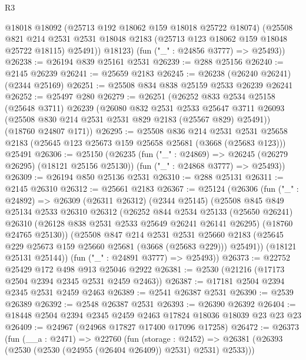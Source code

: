 \begin{lexlean}{R3}
\begin{coremodule}
          @18018
          @18092
          (@25713 @192 @18062 @159 @18018 @25722 @18074)
          (@25508
            @821
            @214
            @2531
            @2531
            @18048
            @2183
            (@25713 @123 @18062 @159 @18048 @25722 @18115)
            @25491))
        @18123)
      (fun ("_" : @24856 @3777) => @25493))
@26238 := @26194 @839 @25161 @2531
@26239 := @288 @25156
@26240 := @2145 @26239
@26241 := @25659 @2183
@26245 := @26238 (@26240 @26241) (@2344 @25169)
@26251 := @25508 @834 @838 @25159 @2533 @26239 @26241
@26252 := @25497 @280
@26279 := @26251
    (@26252
      @833
      @2534
      @25158
      (@25648 @3711)
      @26239
      (@26080
        @832
        @2531
        @2533
        @25647
        @3711
        @26093
        (@25508 @830 @214 @2531 @2531 @829 @2183 (@25567 @829) @25491))
      (@18760 @24807 @171))
@26295 := @25508
    @836
    @214
    @2531
    @2531
    @25658
    @2183
    (@25645 @123 @25673 @159 @25658 @25681 (@3668 (@25683 @123)))
    @25491
@26306 := @25150
    (@26235
      (fun ("_" : @24869) => @26245 (@26279 @26295) (@18121 @25156 @25130))
      (fun ("_" : @24868 @3777) => @25493))
@26309 := @26194 @850 @25136 @2531
@26310 := @288 @25131
@26311 := @2145 @26310
@26312 := @25661 @2183
@26367 := @25124
    (@26306
      (fun ("_" : @24892) =>
      @26309
        (@26311 @26312)
        (@2344 @25145)
        (@25508
          @845
          @849
          @25134
          @2533
          @26310
          @26312
          (@26252
            @844
            @2534
            @25133
            (@25650 @26241)
            @26310
            (@26128 @838 @2531 @2533 @25649 @26241 @26141 @26295)
            (@18760 @24765 @25130))
          (@25508
            @847
            @214
            @2531
            @2531
            @25660
            @2183
            (@25645 @229 @25673 @159 @25660 @25681 (@3668 (@25683 @229)))
            @25491))
        (@18121 @25131 @25144))
      (fun ("_" : @24891 @3777) => @25493))
@26373 := @22752 @25429 @172 @498 @913 @25046 @2922
@26381 := @2530 (@21216 (@17173 @2504 @2394 @2345 @2531 @2459 @2463))
@26387 := @17181 @2504 @2394 @2345 @2531 @2459 @2463
@26389 := @2541 @26387 @2531
@26390 := @2539 @26389
@26392 := @2548 @26387 @2531
@26393 := @26390 @26392
@26404 := @18448 @2504 @2394 @2345 @2459 @2463 @17824 @18036 @18039 @23 @23 @23
@26409 := @24967 (@24968 @17827 @17400 @17096 @17258)
@26472 := @26373
    (fun (__a : @2471) =>
    @22760
      (fun (storage : @2452) =>
      @26381 (@26393 (@2530 (@2530 (@24955 (@26404 @26409)) @2531) @2531) @2533)))

\end{coremodule}
\end{lexlean}
